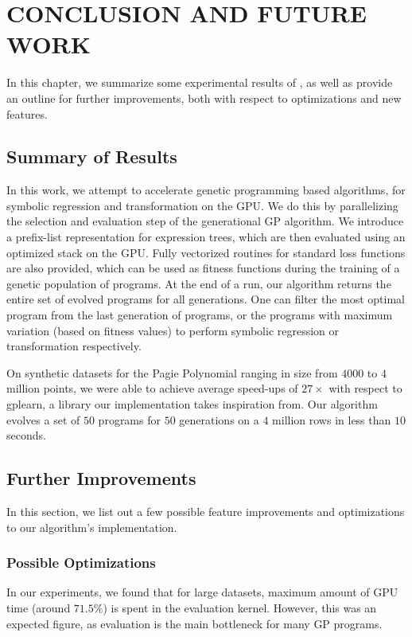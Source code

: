 \chapter{CONCLUSION AND FUTURE WORK}
\label{chap:conclusion}
In this chapter, we summarize some experimental results of , as well as provide an outline for further improvements, both with respect to optimizations and new features.

\section{Summary of Results}
\label{sec:summary}
In this work, we attempt to accelerate genetic programming based algorithms, for symbolic regression and transformation on the GPU. We do this by parallelizing the selection and evaluation step of the generational GP algorithm. We introduce a prefix-list representation for expression trees, which are then evaluated using an optimized stack on the GPU. Fully vectorized routines for standard loss functions are also provided, which can be used as fitness functions during the training of a genetic population of programs. At the end of a run, our algorithm returns the entire set of evolved programs for all generations. One can filter the most optimal program from the last generation of programs, or the programs with maximum variation (based on fitness values) to perform symbolic regression or transformation respectively. 

On synthetic datasets for the Pagie Polynomial ranging in size from $4000$ to $4$ million points, we were able to achieve average speed-ups of $27\times$ with respect to gplearn\citep{gplearn}, a library our implementation takes inspiration from. Our algorithm evolves a set of $50$ programs for $50$ generations on a $4$ million rows in less than $10$ seconds. 

\section{Further Improvements}
\label{sec:improvements}
In this section, we list out a few possible feature improvements and optimizations to our algorithm's implementation.

\subsection{Possible Optimizations}
\label{subsec:optimizations}
In our experiments, we found that for large datasets, maximum amount of GPU time (around $71.5\%$) is spent in the evaluation kernel. However, this was an expected figure, as evaluation is the main bottleneck for many GP programs. 


